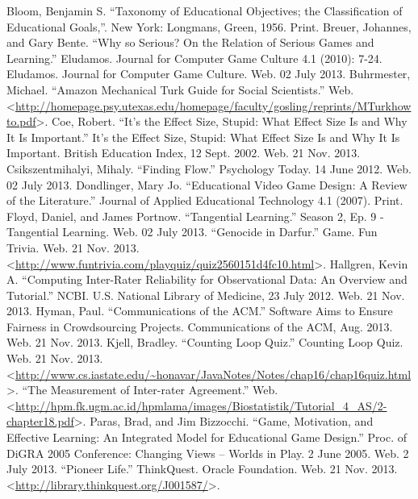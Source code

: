 \documentclass[12pt]{report}
\begin{document}
\begin{thebibliography}{1}

Bloom, Benjamin S. ``Taxonomy of Educational Objectives; the Classification of Educational Goals,''. New York: Longmans, Green, 1956. Print.
 Breuer, Johannes, and Gary Bente. ``Why so Serious? On the Relation of Serious Games and Learning.'' Eludamos. Journal for Computer Game Culture 4.1 (2010): 7-24. Eludamos. Journal for Computer Game Culture. Web. 02 July 2013.
 Buhrmester, Michael. ``Amazon Mechanical Turk Guide for Social Scientists.'' Web. \textless \url{http://homepage.psy.utexas.edu/homepage/faculty/gosling/reprints/MTurkhowto.pdf}\textgreater.
\bibitem{} Coe, Robert. ``It's the Effect Size, Stupid: What Effect Size Is and Why It Is Important.'' It's the Effect Size, Stupid: What Effect Size Is and Why It Is Important. British Education Index, 12 Sept. 2002. Web. 21 Nov. 2013.
 Csikszentmihalyi, Mihaly. ``Finding Flow.'' Psychology Today. 14 June 2012. Web. 02 July 2013.
 Dondlinger, Mary Jo. ``Educational Video Game Design: A Review of the Literature.'' Journal of Applied Educational Technology 4.1 (2007). Print.
 Floyd, Daniel, and James Portnow. ``Tangential Learning.'' Season 2, Ep. 9 - Tangential Learning. Web. 02 July 2013.
\bibitem{} ``Genocide in Darfur.'' Game. Fun Trivia. Web. 21 Nov. 2013. \textless \url{http://www.funtrivia.com/playquiz/quiz2560151d4fc10.html}\textgreater.
 Hallgren, Kevin A. ``Computing Inter-Rater Reliability for Observational Data: An Overview and Tutorial.'' NCBI. U.S. National Library of Medicine, 23 July 2012. Web. 21 Nov. 2013.
 Hyman, Paul. ``Communications of the ACM.'' Software Aims to Ensure Fairness in Crowdsourcing Projects. Communications of the ACM, Aug. 2013. Web. 21 Nov. 2013.
\bibitem{} Kjell, Bradley. ``Counting Loop Quiz.'' Counting Loop Quiz. Web. 21 Nov. 2013. \textless \url{http://www.cs.iastate.edu/~honavar/JavaNotes/Notes/chap16/chap16quiz.html}\textgreater.
 ``The Measurement of Inter-rater Agreement.'' Web. \textless \url{http://hpm.fk.ugm.ac.id/hpmlama/images/Biostatistik/Tutorial\_4\_AS/2-chapter18.pdf}\textgreater.
 Paras, Brad, and Jim Bizzocchi. ``Game, Motivation, and Effective Learning: An Integrated Model for Educational Game Design.'' Proc. of DiGRA 2005 Conference: Changing Views – Worlds in Play. 2 June 2005. Web. 2 July 2013.
\bibitem{} ``Pioneer Life.'' ThinkQuest. Oracle Foundation. Web. 21 Nov. 2013. \textless \url{http://library.thinkquest.org/J001587/}\textgreater.

\end{thebibliography}
\end{document}
